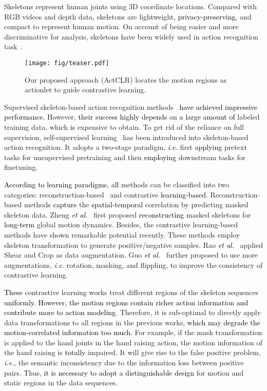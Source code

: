 \documentclass[twocolumn]{article}
\newcommand{\wh}[1]{\textcolor{black}{#1}}
\begin{document}
Skeletons represent human joints using 3D coordinate locations. 
Compared with RGB videos and depth data, skeletons are lightweight, \wh{privacy-preserving}, and compact to represent human motion. 
On account of being easier and more discriminative for analysis, skeletons have been widely used in action recognition task~\cite{zhang2020context,liu2020disentangling,zhang2020semantics,song2020stronger,peng2020learning,su2020predict}.

\begin{figure}[tb]
\texttt{[image: fig/teaser.pdf]}
\caption{
Our proposed approach (ActCLR) locates the motion regions as actionlet to guide contrastive learning.
}
\label{fig:teaser}
\end{figure}

Supervised skeleton-based action recognition methods~\cite{si2019attention,shi2019two,chen2021channel} \wh{have achieved impressive performance}.
However, \wh{their success highly depends} on \wh{a large amount of} labeled training data, which \wh{is} expensive to obtain. 
To get rid of the reliance on full supervision, self-supervised learning~\cite{zheng2018unsupervised,lin2020ms2l,su2020predict,thoker2021skeleton} has been introduced into skeleton-based action recognition. 
It adopts a two-stage paradigm, \wh{\textit{i.e.}} first \wh{applying} pretext tasks for unsupervised pretraining and then \wh{employing} downstream tasks for finetuning.

\wh{According to learning paradigms, all} methods can be classified into two categories: reconstruction-based~\cite{su2020predict,yang2021skeleton,kim2022global} and contrastive \wh{learning-based}.
Reconstruction-based methods \wh{capture} the \wh{spatial-temporal} correlation by predicting masked skeleton data. 
Zheng \wh{\textit{et al.}}~\cite{zheng2018unsupervised} first proposed \wh{reconstructing} masked skeletons for \wh{long-term} global motion dynamics.
Besides, the contrastive learning-based methods have shown remarkable potential recently. These methods employ skeleton transformation to generate positive/negative samples.
Rao \wh{\textit{et al.}}~\cite{rao2021augmented} applied Shear and Crop as data augmentation.
Guo \wh{\textit{et al.}}~\cite{guo2021contrastive} further proposed to use more augmentations, \wh{\textit{i.e.}} rotation, masking\wh{,} and flippling, to improve the consistency of contrastive learning.

\wh{These} contrastive learning works treat different regions of the skeleton sequences \wh{uniformly}.
\wh{However, the motion regions contain richer action information and contribute more to action modeling.}
Therefore, it is sub-optimal to directly apply data transformations to all regions in the previous works, \wh{which may degrade the motion-correlated information too much}. 
For example, if the mask transformation is applied to the hand joints in the hand raising action, the motion information of the hand raising is \wh{totally} impaired.
It will give rise to the false positive problem, \textit{i.e.}, the semantic inconsistency due to the information loss between positive pairs.
Thus, \wh{it is necessary to adopt a distinguishable design} for motion and static regions in the data sequences.
\end{document}
